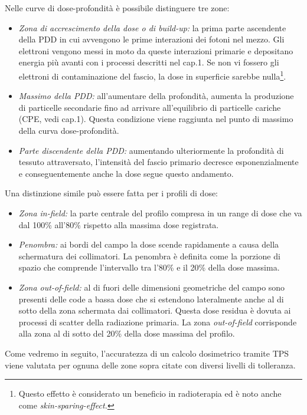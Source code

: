 Nelle curve di dose-profondità è possibile distinguere tre zone:
\begin{itemize}
\item \textit{Zona di accrescimento della dose o di build-up:} la prima parte ascendente della PDD in cui avvengono le prime interazioni dei fotoni nel mezzo. Gli elettroni vengono messi in moto da queste interazioni primarie e depositano energia più avanti con i processi descritti nel cap.1. Se non vi fossero gli elettroni di contaminazione del fascio, la dose in superficie sarebbe nulla\footnote{Questo effetto è considerato un beneficio in radioterapia ed è noto anche come \textit{skin-sparing-effect.}}.
\item \textit{Massimo della PDD:} all'aumentare della profondità, aumenta la produzione di particelle secondarie fino ad arrivare all'equilibrio di particelle cariche (CPE, vedi cap.1). Questa condizione viene raggiunta nel punto di massimo della curva dose-profondità.
\item \textit{Parte discendente della PDD:} aumentando ulteriormente la profondità di tessuto attraversato, l'intensità del fascio primario decresce esponenzialmente e conseguentemente anche la dose segue questo andamento.
\end{itemize}

Una distinzione simile può essere fatta per i profili di dose:
\begin{itemize}
\item \textit{Zona in-field:} la parte centrale del profilo compresa in un range di dose che va dal 100\% all'80\% rispetto alla massima dose registrata.
\item \textit{Penombra:} ai bordi del campo la dose scende rapidamente a causa della schermatura dei collimatori. La penombra è definita come la porzione di spazio che comprende l'intervallo tra l'80\% e il 20\% della dose massima.
\item \textit{Zona out-of-field:} al di fuori delle dimensioni geometriche del campo sono presenti delle code a bassa dose che si estendono lateralmente anche al di sotto della zona schermata dai collimatori. Questa dose residua è dovuta ai processi di scatter della radiazione primaria. La zona \textit{out-of-field} corrisponde alla zona al di sotto del 20\% della dose massima del profilo.
\end{itemize}

Come vedremo in seguito, l'accuratezza di un calcolo dosimetrico tramite TPS viene valutata per ognuna delle zone sopra citate con diversi livelli di tolleranza. 

